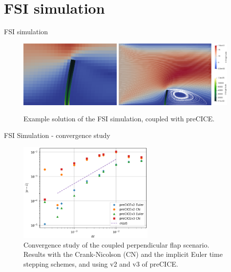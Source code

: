 \documentclass[
  english,            %
  aspectratio=43,    %
]{tumbeamer}
\begin{document}
\section{FSI simulation}
\begin{frame}{FSI simulation}
\vspace*{\fill}

    \begin{figure}[!ht]
    \centering
    \includegraphics[width=0.45\textwidth]{resources/FSI_small.png}
    \includegraphics[width=0.523\textwidth]{resources/FSI_big.png}
    \caption{Example solution of the FSI simulation, coupled with preCICE.}
    \label{fig:FSI}
\end{figure}
\end{frame}

\begin{frame}{FSI Simulation - convergence study}
    \begin{figure}[!ht]
    \centering
    \includegraphics[width=0.6\textwidth]{resources/coupled_v2_v3_results.png}
    \caption{Convergence study of the coupled perpendicular flap scenario. Results with the Crank-Nicolson (CN) and the implicit Euler time stepping schemes, and using v2 and v3 of preCICE.}
    \label{fig:coupled_v2_v3}
\end{figure}
\end{frame}
\end{document}
